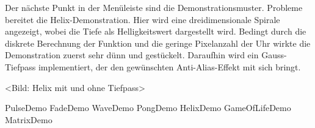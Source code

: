 %
Der nächste Punkt in der Menüleiste sind die Demonstrationsmuster.
Probleme bereitet die Helix-Demonstration. Hier wird eine dreidimensionale Spirale angezeigt, wobei die Tiefe als Helligkeitswert dargestellt wird.
Bedingt durch die diskrete Berechnung der Funktion und die geringe Pixelanzahl der Uhr wirkte die Demonstration zuerst sehr dünn und gestückelt.
Daraufhin wird ein Gauss-Tiefpass implementiert, der den gewünschten Anti-Alias-Effekt mit sich bringt.

<Bild: Helix mit und ohne Tiefpass>

PulseDemo
FadeDemo
WaveDemo
PongDemo
HelixDemo
GameOfLifeDemo
MatrixDemo

